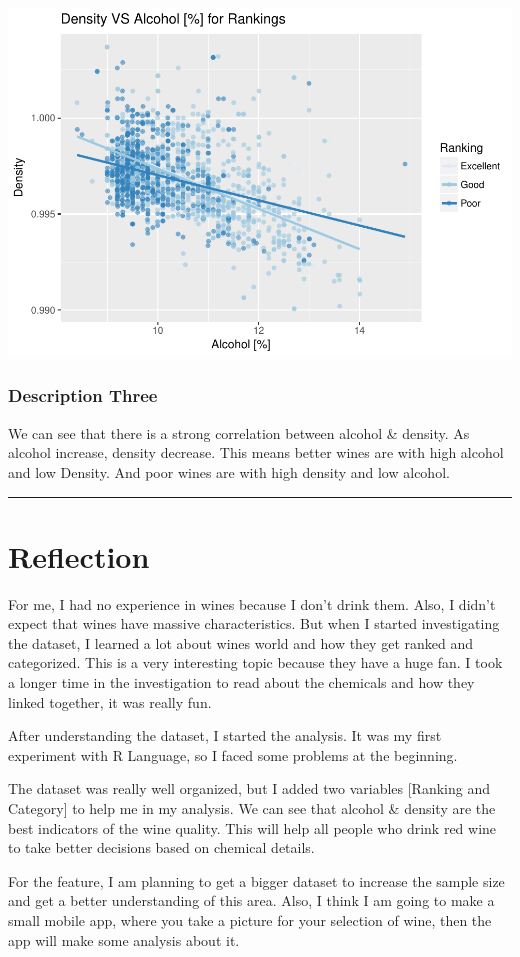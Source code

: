\documentclass[]{article}
\begin{document}
\includegraphics{RedWine_files/figure-latex/Plot_Three-1.pdf}

\subsubsection{Description Three}\label{description-three}

We can see that there is a strong correlation between alcohol \&
density. As alcohol increase, density decrease. This means better wines
are with high alcohol and low Density. And poor wines are with high
density and low alcohol.

\begin{center}\rule{0.5\linewidth}{\linethickness}\end{center}

\section{Reflection}\label{reflection}

For me, I had no experience in wines because I don't drink them. Also, I
didn't expect that wines have massive characteristics. But when I
started investigating the dataset, I learned a lot about wines world and
how they get ranked and categorized. This is a very interesting topic
because they have a huge fan. I took a longer time in the investigation
to read about the chemicals and how they linked together, it was really
fun.

After understanding the dataset, I started the analysis. It was my first
experiment with R Language, so I faced some problems at the beginning.

The dataset was really well organized, but I added two variables
{[}Ranking and Category{]} to help me in my analysis. We can see that
alcohol \& density are the best indicators of the wine quality. This
will help all people who drink red wine to take better decisions based
on chemical details.

For the feature, I am planning to get a bigger dataset to increase the
sample size and get a better understanding of this area. Also, I think I
am going to make a small mobile app, where you take a picture for your
selection of wine, then the app will make some analysis about it.
\end{document}
